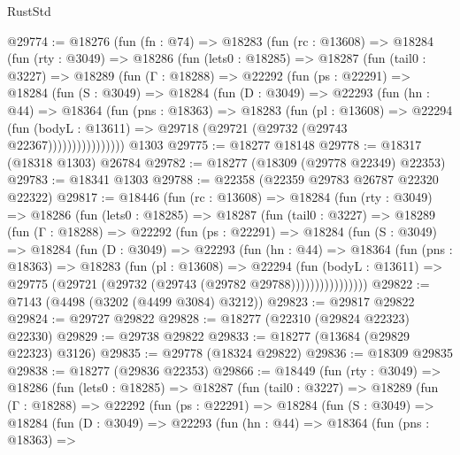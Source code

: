 \begin{lexlean}{RustStd}
\begin{coremodule}
@29774 := @18276
    (fun (fn : @74) =>
    @18283
      (fun (rc : @13608) =>
      @18284
        (fun (rty : @3049) =>
        @18286
          (fun (lets0 : @18285) =>
          @18287
            (fun (tail0 : @3227) =>
            @18289
              (fun (Γ : @18288) =>
              @22292
                (fun (ps : @22291) =>
                @18284
                  (fun (S : @3049) =>
                  @18284
                    (fun (D : @3049) =>
                    @22293
                      (fun (hn : @44) =>
                      @18364
                        (fun (pns : @18363) =>
                        @18283
                          (fun (pl : @13608) =>
                          @22294
                            (fun (bodyL : @13611) =>
                            @29718 (@29721 (@29732 (@29743 @22367))))))))))))))))
    @1303
@29775 := @18277 @18148
@29778 := @18317 (@18318 @1303) @26784
@29782 := @18277 (@18309 (@29778 @22349) @22353)
@29783 := @18341 @1303
@29788 := @22358 (@22359 @29783 @26787 @22320 @22322)
@29817 := @18446
    (fun (rc : @13608) =>
    @18284
      (fun (rty : @3049) =>
      @18286
        (fun (lets0 : @18285) =>
        @18287
          (fun (tail0 : @3227) =>
          @18289
            (fun (Γ : @18288) =>
            @22292
              (fun (ps : @22291) =>
              @18284
                (fun (S : @3049) =>
                @18284
                  (fun (D : @3049) =>
                  @22293
                    (fun (hn : @44) =>
                    @18364
                      (fun (pns : @18363) =>
                      @18283
                        (fun (pl : @13608) =>
                        @22294
                          (fun (bodyL : @13611) =>
                          @29775 (@29721 (@29732 (@29743 (@29782 @29788))))))))))))))))
@29822 := @7143 (@4498 (@3202 (@4499 @3084) @3212))
@29823 := @29817 @29822
@29824 := @29727 @29822
@29828 := @18277 (@22310 (@29824 @22323) @22330)
@29829 := @29738 @29822
@29833 := @18277 (@13684 (@29829 @22323) @3126)
@29835 := @29778 (@18324 @29822)
@29836 := @18309 @29835
@29838 := @18277 (@29836 @22353)
@29866 := @18449
    (fun (rty : @3049) =>
    @18286
      (fun (lets0 : @18285) =>
      @18287
        (fun (tail0 : @3227) =>
        @18289
          (fun (Γ : @18288) =>
          @22292
            (fun (ps : @22291) =>
            @18284
              (fun (S : @3049) =>
              @18284
                (fun (D : @3049) =>
                @22293
                  (fun (hn : @44) =>
                  @18364
                    (fun (pns : @18363) =>

\end{coremodule}
\end{lexlean}
